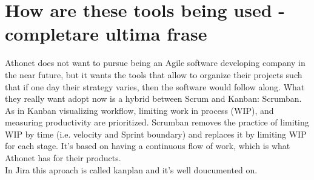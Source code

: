 \section{How are these tools being used - completare ultima frase}
	Athonet does not want to pursue being an Agile software developing company in the near future, but it wants the tools that allow to organize their projects such that if one day their strategy varies, then the software would follow along.
	What they really want adopt now is a hybrid between Scrum and Kanban: Scrumban.\\	
	As in Kanban visualizing workflow, limiting work in process (WIP), and measuring productivity are prioritized.	
	Scrumban removes the practice of limiting WIP by time (i.e. velocity and Sprint boundary) and replaces it by limiting WIP for each stage.
	It's based on having a continuous flow of work, which is what Athonet has for their products.\\	
	In Jira this aproach is called kanplan and it's well doucumented on.
	